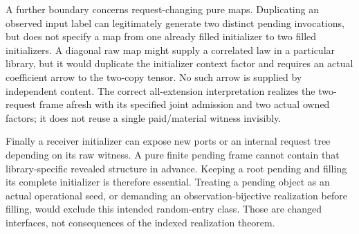 \documentclass[11pt]{article}
\begin{document}
A further boundary concerns request-changing pure maps. Duplicating an observed input label can legitimately generate two distinct pending invocations, but does not specify a map from one already filled initializer to two filled initializers. A diagonal raw map might supply a correlated law in a particular library, but it would duplicate the initializer context factor and requires an actual coefficient arrow to the two-copy tensor. No such arrow is supplied by independent content. The correct all-extension interpretation realizes the two-request frame afresh with its specified joint admission and two actual owned factors; it does not reuse a single paid/material witness invisibly.

Finally a receiver initializer can expose new ports or an internal request tree depending on its raw witness. A pure finite pending frame cannot contain that library-specific revealed structure in advance. Keeping a root pending and filling its complete initializer is therefore essential. Treating a pending object as an actual operational seed, or demanding an observation-bijective realization before filling, would exclude this intended random-entry class. Those are changed interfaces, not consequences of the indexed realization theorem.
\end{document}
